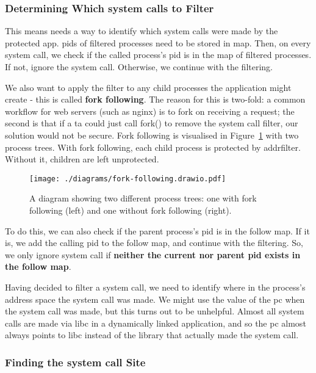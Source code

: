 \subsubsection{Determining Which system calls to
Filter}\label{subsec:design-fork-following}

This means \af needs a way to identify which system calls were made by the
protected app. \acp{pid} of filtered processes
need to be stored in  map. Then, on every system call, we check if the
called process's \ac{pid} is in the map of filtered processes. If not, ignore
the system call. Otherwise, we continue with the filtering.

We also want to apply the filter to any child processes the
application might create - this is called \textbf{fork following}. The reason for this is two-fold: a common workflow for
web servers (such as nginx) \cite{apache-prefork-2.4, nginx-inside-performance-scale-2015} is to fork on receiving a request; the second is
that if a \ac{ta} could just call fork() to remove the system call filter, our
solution would not be secure. Fork following is visualised in
Figure~\ref{fig:fork-follow-process-tree} with two process trees. With fork
following, each child process is protected by addrfilter. Without it, children
are left unprotected.

\begin{figure}[ht]
    \centering
    \texttt{[image: ./diagrams/fork-following.drawio.pdf]} 
    \caption{A diagram showing two different process trees: one with fork
    following (left) and one without fork following (right).}
    \label{fig:fork-follow-process-tree}
\end{figure}


To do this, we can also check if the parent process's \ac{pid} is in the follow
map. If it is, we add the calling \ac{pid} to the follow map, and continue with
the filtering. So, we only ignore system call if \textbf{neither the current nor
parent \ac{pid} exists in the follow map}.

Having decided to filter a system call, we need to identify where in the process's
address space the system call was made. We might use the value of the \ac{pc} when
the system call was made, but this turns out to be unhelpful.
Almost all system calls are made via \ac{libc} in a dynamically linked 
application, and so the \ac{pc} almost always points to \ac{libc} instead of the
library that actually made the system call.

\subsubsection{Finding the system call Site}\label{subsubsec:find_syscall}

